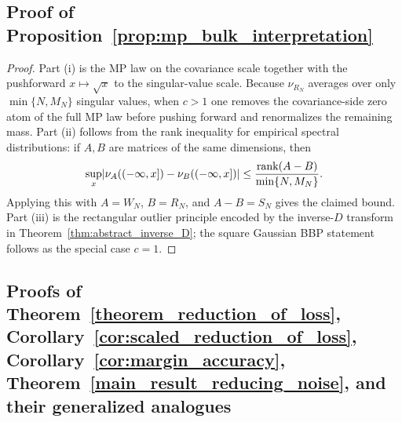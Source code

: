 \documentclass[11pt]{article}
\theoremstyle{plain}
\theoremstyle{definition}
\theoremstyle{remark}
\DeclarePairedDelimiter{\abs}{\lvert}{\rvert}
\newcommand{\rank}{\operatorname{rank}}
\newcommand{\1}{\mathbf{1}}
\begin{document}
\subsection{Proof of Proposition~\ref{prop:mp_bulk_interpretation}}

\begin{proof}
Part (i) is the MP law on the covariance scale together with the pushforward \(x\mapsto \sqrt x\) to the singular-value scale. Because \(\nu_{R_N}\) averages over only \(\min\{N,M_N\}\) singular values, when \(c>1\) one removes the covariance-side zero atom of the full MP law before pushing forward and renormalizes the remaining mass. Part (ii) follows from the rank inequality for empirical spectral distributions: if \(A,B\) are matrices of the same dimensions, then
\[
\sup_x \abs{\nu_A((-\infty,x])-\nu_B((-\infty,x])}
\le
\frac{\rank(A-B)}{\min\{N,M_N\}}.
\]
Applying this with \(A=W_N\), \(B=R_N\), and \(A-B=S_N\) gives the claimed bound. Part (iii) is the rectangular outlier principle encoded by the inverse-\(D\) transform in Theorem~\ref{thm:abstract_inverse_D}; the square Gaussian BBP statement follows as the special case \(c=1\).
\end{proof}

\subsection{Proofs of Theorem~\ref{theorem_reduction_of_loss}, Corollary~\ref{cor:scaled_reduction_of_loss}, Corollary~\ref{cor:margin_accuracy}, Theorem~\ref{main_result_reducing_noise}, and their generalized analogues}
\end{document}
